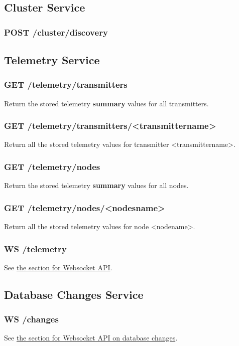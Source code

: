 \subsection{Cluster Service}

\subsubsection{POST /cluster/discovery}


\subsection{Telemetry Service}

\subsubsection{GET /telemetry/transmitters}
Return the stored telemetry \textbf{summary} values for all transmitters.

\subsubsection{GET /telemetry/transmitters/<transmittername>}
Return all the stored telemetry values for transmitter <transmittername>.

\subsubsection{GET /telemetry/nodes}
Return the stored telemetry \textbf{summary} values for all nodes.

\subsubsection{GET /telemetry/nodes/<nodesname>}
Return all the stored telemetry values for node <nodename>.

\subsubsection{WS /telemetry}
See \hyperref[protocoldef:websocketapi]{the section for Websocket API}.


\subsection{Database Changes Service}

\subsubsection{WS /changes}
See \hyperref[protcoldef:websocketapi:databasechanges]{the section for Websocket API on database changes}.

